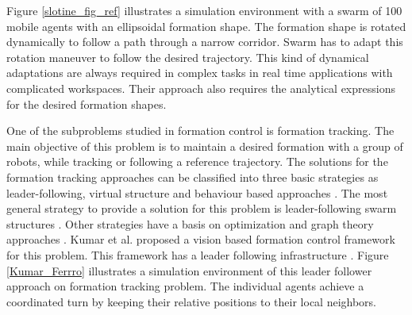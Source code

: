 Figure \ref{slotine_fig_ref} illustrates a simulation environment with a swarm of 100 mobile agents with an ellipsoidal formation shape. The formation shape is rotated dynamically to follow a path through a narrow corridor. Swarm has to adapt this  rotation maneuver to follow the desired trajectory. This kind of dynamical adaptations are always required in complex tasks in real time applications with complicated workspaces. Their approach also requires the analytical expressions for the desired formation shapes.

One of the subproblems studied in formation control is formation tracking. The main objective of this problem is to maintain a desired formation with a group of robots, while tracking or following a reference trajectory. The solutions for the formation tracking approaches can be classified into three basic strategies as leader-following, virtual structure and behaviour based approaches \cite{12}. The most general strategy to provide a solution for this problem is leader-following swarm structures \cite{18}. Other strategies have a basis on optimization and graph theory approaches \cite{12}. Kumar et al. proposed a vision based formation control framework  for this problem. This framework has a leader following infrastructure \cite{18}. Figure \ref{Kumar_Ferrro} illustrates a simulation environment of this leader follower approach on formation tracking problem. The individual agents achieve a coordinated turn by keeping their relative positions to their local neighbors. 

